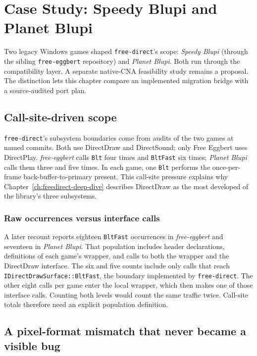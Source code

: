 \chapter{Case Study: Speedy Blupi and Planet Blupi}
\label{ch:blupi-case-study}

Two legacy Windows games shaped \texttt{free-direct}'s scope: \emph{Speedy Blupi} (through the
sibling \texttt{free-eggbert} repository) and \emph{Planet Blupi}. Both run through the
compatibility layer. A separate native-CNA feasibility study remains a proposal. The distinction
lets this chapter compare an implemented migration bridge with a source-audited port plan.

\section{Call-site-driven scope}

\texttt{free-direct}'s subsystem boundaries come from audits of the two games at named commits.
Both use DirectDraw and DirectSound; only Free Eggbert uses DirectPlay. \emph{free-eggbert} calls
\texttt{Blt} four times and \texttt{BltFast} six times; \emph{Planet Blupi} calls them three and
five times. In each game, one \texttt{Blt} performs the once-per-frame back-buffer-to-primary
present. This call-site pressure explains why Chapter~\ref{ch:freedirect-deep-dive} describes
DirectDraw as the most developed of the library's three subsystems.

\subsection{Raw occurrences versus interface calls}

A later recount reports eighteen \texttt{BltFast} occurrences in \emph{free-eggbert} and
seventeen in \emph{Planet Blupi}. That population includes header declarations, definitions of
each game's  wrapper, and calls to both the wrapper and the DirectDraw
interface. The six and five counts include only calls that reach
\texttt{IDirectDrawSurface::BltFast}, the boundary implemented by \texttt{free-direct}. The other
eight calls per game enter the local wrapper, which then makes one of those interface calls.
Counting both levels would count the same traffic twice. Call-site totals therefore need an
explicit population definition.

\section{A pixel-format mismatch that never became a visible bug}
\label{sec:blupi-pixel-format-mismatch}

